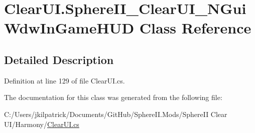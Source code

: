 \hypertarget{class_clear_u_i_1_1_sphere_i_i___clear_u_i___n_gui_wdw_in_game_h_u_d}{}\section{Clear\+U\+I.\+Sphere\+I\+I\+\_\+\+Clear\+U\+I\+\_\+\+N\+Gui\+Wdw\+In\+Game\+H\+UD Class Reference}
\label{class_clear_u_i_1_1_sphere_i_i___clear_u_i___n_gui_wdw_in_game_h_u_d}


\subsection{Detailed Description}


Definition at line 129 of file Clear\+U\+I.\+cs.



The documentation for this class was generated from the following file\+:\begin{DoxyCompactItemize}
\item 
C\+:/\+Users/jkilpatrick/\+Documents/\+Git\+Hub/\+Sphere\+I\+I.\+Mods/\+Sphere\+I\+I Clear U\+I/\+Harmony/\mbox{\hyperlink{_clear_u_i_8cs}{Clear\+U\+I.\+cs}}\end{DoxyCompactItemize}

